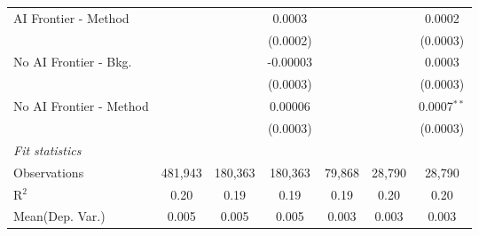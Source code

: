 \begin{tabular}{lcccccc}
   AI Frontier - Method    &                &                & 0.0003         &                &                & 0.0002\\   
                           &                &                & (0.0002)       &                &                & (0.0003)\\   
   No AI Frontier - Bkg.   &                &                & -0.00003       &                &                & 0.0003\\   
                           &                &                & (0.0003)       &                &                & (0.0003)\\   
   No AI Frontier - Method &                &                & 0.00006        &                &                & 0.0007$^{**}$\\   
                           &                &                & (0.0003)       &                &                & (0.0003)\\   
   \midrule
   \emph{Fit statistics}\\
   Observations            & 481,943        & 180,363        & 180,363        & 79,868         & 28,790         & 28,790\\  
   R$^2$                   & 0.20           & 0.19           & 0.19           & 0.19           & 0.20           & 0.20\\  
Mean(Dep. Var.) & 0.005 & 0.005 & 0.005 & 0.003 & 0.003 & 0.003 \\
   

\end{tabular}

